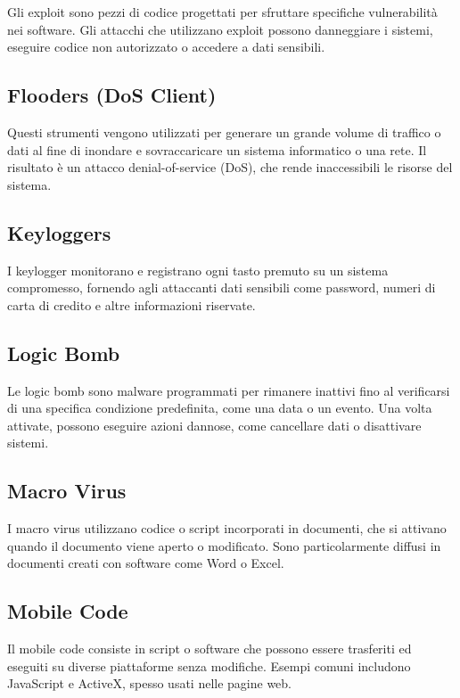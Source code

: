 Gli exploit sono pezzi di codice progettati per sfruttare specifiche vulnerabilità nei software. Gli attacchi che utilizzano exploit possono danneggiare i sistemi, eseguire codice non autorizzato o accedere a dati sensibili.

\subsection{Flooders (DoS Client)}

Questi strumenti vengono utilizzati per generare un grande volume di traffico o dati al fine di inondare e sovraccaricare un sistema informatico o una rete. Il risultato è un attacco denial-of-service (DoS), che rende inaccessibili le risorse del sistema.

\subsection{Keyloggers}

I keylogger monitorano e registrano ogni tasto premuto su un sistema compromesso, fornendo agli attaccanti dati sensibili come password, numeri di carta di credito e altre informazioni riservate.

\subsection{Logic Bomb}

Le logic bomb sono malware programmati per rimanere inattivi fino al verificarsi di una specifica condizione predefinita, come una data o un evento. Una volta attivate, possono eseguire azioni dannose, come cancellare dati o disattivare sistemi.

\subsection{Macro Virus}

I macro virus utilizzano codice o script incorporati in documenti, che si attivano quando il documento viene aperto o modificato. Sono particolarmente diffusi in documenti creati con software come Word o Excel.

\subsection{Mobile Code}

Il mobile code consiste in script o software che possono essere trasferiti ed eseguiti su diverse piattaforme senza modifiche. Esempi comuni includono JavaScript e ActiveX, spesso usati nelle pagine web.

